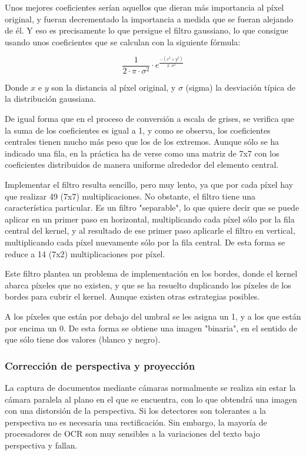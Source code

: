 Unos mejores coeficientes serían aquellos que dieran más importancia al píxel original, y fueran decrementado la importancia a medida que se fueran alejando de él. Y eso es precisamente lo que persigue el filtro gaussiano, lo que consigue usando unos coeficientes que se calculan con la siguiente fórmula:

\begin{equation}
  \frac{1}{2 \cdot \pi \cdot \sigma^{2}} \cdot e^{\frac{-(x^2 + y^2)}{2 \cdot \sigma^{2}}}
\end{equation}

Donde $x$ e $y$ son la distancia al píxel original, y $\sigma$ (sigma) la desviación típica de la distribución gaussiana. 

De igual forma que en el proceso de conversión a escala de grises, se verifica que la suma de los coeficientes es igual a 1, y como se observa, los coeficientes centrales tienen mucho más peso que los de los extremos. Aunque sólo se ha indicado una fila, en la práctica ha de verse como una matriz de 7x7 con los coeficientes distribuidos de manera uniforme alrededor del elemento central. 

Implementar el filtro resulta sencillo, pero muy lento, ya que por cada píxel hay que realizar 49 (7x7) multiplicaciones. No obstante, el filtro tiene una característica particular. Es un filtro "separable", lo que quiere decir que se puede aplicar en un primer paso en horizontal, multiplicando cada píxel sólo por la fila central del kernel, y al resultado de ese primer paso aplicarle el filtro en vertical, multiplicando cada píxel nuevamente sólo por la fila central. De esta forma se reduce a 14 (7x2) multiplicaciones por píxel. 

Este filtro plantea un problema de implementación en los bordes, donde el kernel abarca píxeles que no existen, y que se ha resuelto duplicando los píxeles de los bordes para cubrir el kernel. Aunque existen otras estrategias posibles.

A los píxeles que están por debajo del umbral se les asigna un 1, y a los que están por encima un 0. De esta forma se obtiene una imagen "binaria", en el sentido de que sólo tiene dos valores (blanco y negro).

\subsubsection{Corrección de perspectiva y proyección}
La captura de documentos mediante cámaras normalmente se realiza sin estar la cámara paralela al plano en el que se encuentra, con lo que obtendrá una imagen con una distorsión de la perspectiva. 
Si los detectores son tolerantes a la perspectiva no es necesaria una rectificación. Sin embargo, la mayoría de procesadores de OCR son muy sensibles a la variaciones del texto bajo perspectiva y fallan.

